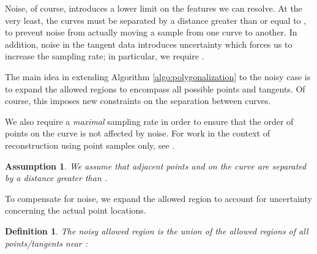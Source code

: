 \documentclass{article}
\newtheorem{definition}[cntr]{Definition}
\newtheorem{assumption}{Assumption}
\numberwithin{cntr}{section}
\numberwithin{equation}{section}
\begin{document}
Noise, of course, introduces a lower limit on the features we can resolve. At the very least, the curves must be separated by a distance greater than or equal to , to prevent noise from actually moving a sample from one curve to another. In addition, noise in the tangent data introduces uncertainty which forces us to increase the sampling rate; in particular, we require .

The main idea in extending Algorithm \ref{algo:polygonalization} to the noisy case is to expand the allowed regions to encompass all possible points and tangents. Of course, this imposes new constraints on the separation between curves.

We also require a \emph{maximal} sampling rate in order to ensure that the order of points on the curve is not affected by noise.
For work in the context of reconstruction using point samples only, see \cite{chengnoise,mdnoise}.

\begin{assumption}
  \label{ass:minSamplingRateNoisy}
  We assume that adjacent points  and  on the curve  are separated by a distance greater
  than .
\end{assumption}

To compensate for noise, we expand the allowed region to account
for uncertainty concerning the actual point locations.

\begin{definition}
  \label{def:AllowedRegionNoisy}
The \emph{noisy allowed region} 
is the union of the allowed regions of all points/tangents
near :
  
\end{definition}

\vspace{.2in}
\end{document}
